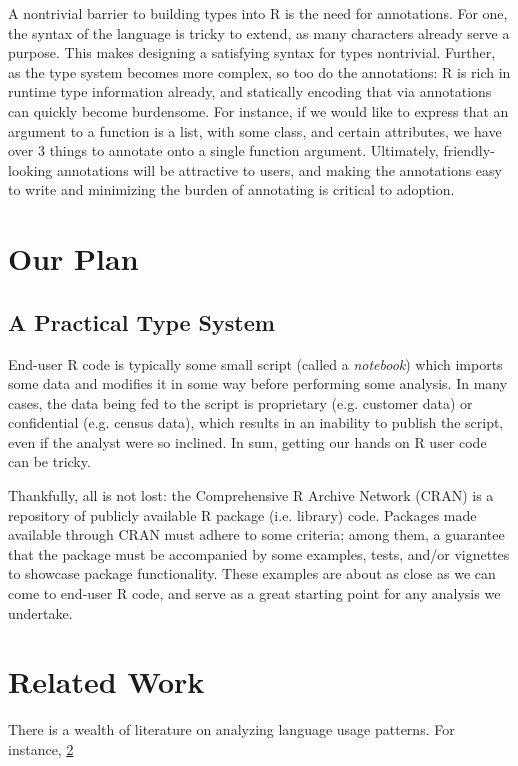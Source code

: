 \documentclass[sigplan,10pt,review,anonymous]{acmart}\settopmatter{printfolios=true,printccs=false,printacmref=false}
\begin{document}
A nontrivial barrier to building types into R is the need for annotations.
For one, the syntax of the language is tricky to extend, as many characters already serve a purpose.
This makes designing a satisfying syntax for types nontrivial.
Further, as the type system becomes more complex, so too do the annotations:
R is rich in runtime type information already, and statically encoding that via annotations can quickly become burdensome.
For instance, if we would like to express that an argument to a function is a list, with some class, and certain attributes, we have over 3 things to annotate onto a single function argument.
Ultimately, friendly-looking annotations will be attractive to users, and making the annotations easy to write and minimizing the burden of annotating is critical to adoption.

%
%
%
%
\section{Our Plan}
\label{sec:plan}

%
%
\subsection{A Practical Type System}
\label{sec:practicalTS}

End-user R code is typically some small script (called a {\it notebook}) which imports some data and modifies it in some way before performing some analysis.
In many cases, the data being fed to the script is proprietary (e.g. customer data) or confidential (e.g. census data), which results in an inability to publish the script, even if the analyst were so inclined.
In sum, getting our hands on R user code can be tricky.

Thankfully, all is not lost: the Comprehensive R Archive Network (CRAN) is a repository of publicly available R package (i.e. library) code.
Packages made available through CRAN must adhere to some criteria; among them, a guarantee that the package must be accompanied by some examples, tests, and/or vignettes to showcase package functionality.
These examples are about as close as we can come to end-user R code, and serve as a great starting point for any analysis we undertake.

%
%
%
%
\section{Related Work}

There is a wealth of literature on analyzing language usage patterns.
For instance, \ref{}

%
%
%


\end{document}
